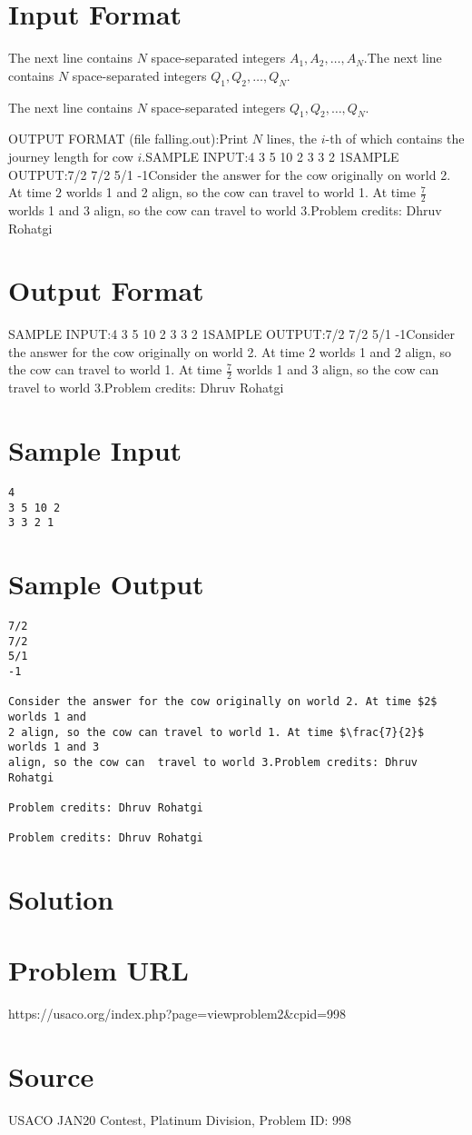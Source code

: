 \documentclass[12pt]{article}
\begin{document}
\section*{Input Format}
The next line contains $N$ space-separated integers $A_1,A_2,\ldots,A_N.$The next line contains $N$ space-separated integers $Q_1,Q_2,\ldots,Q_N.$

The next line contains $N$ space-separated integers $Q_1,Q_2,\ldots,Q_N.$

OUTPUT FORMAT (file falling.out):Print $N$ lines, the $i$-th of which contains the journey length for cow $i.$SAMPLE INPUT:4
3 5 10 2
3 3 2 1SAMPLE OUTPUT:7/2
7/2
5/1
-1Consider the answer for the cow originally on world 2. At time $2$ worlds 1 and
2 align, so the cow can travel to world 1. At time $\frac{7}{2}$ worlds 1 and 3
align, so the cow can  travel to world 3.Problem credits: Dhruv Rohatgi

\section*{Output Format}
SAMPLE INPUT:4
3 5 10 2
3 3 2 1SAMPLE OUTPUT:7/2
7/2
5/1
-1Consider the answer for the cow originally on world 2. At time $2$ worlds 1 and
2 align, so the cow can travel to world 1. At time $\frac{7}{2}$ worlds 1 and 3
align, so the cow can  travel to world 3.Problem credits: Dhruv Rohatgi

\section*{Sample Input}
\begin{verbatim}
4
3 5 10 2
3 3 2 1
\end{verbatim}

\section*{Sample Output}
\begin{verbatim}
7/2
7/2
5/1
-1

Consider the answer for the cow originally on world 2. At time $2$ worlds 1 and
2 align, so the cow can travel to world 1. At time $\frac{7}{2}$ worlds 1 and 3
align, so the cow can  travel to world 3.Problem credits: Dhruv Rohatgi

Problem credits: Dhruv Rohatgi

Problem credits: Dhruv Rohatgi
\end{verbatim}

\section*{Solution}


\section*{Problem URL}
https://usaco.org/index.php?page=viewproblem2&cpid=998

\section*{Source}
USACO JAN20 Contest, Platinum Division, Problem ID: 998
\end{document}

